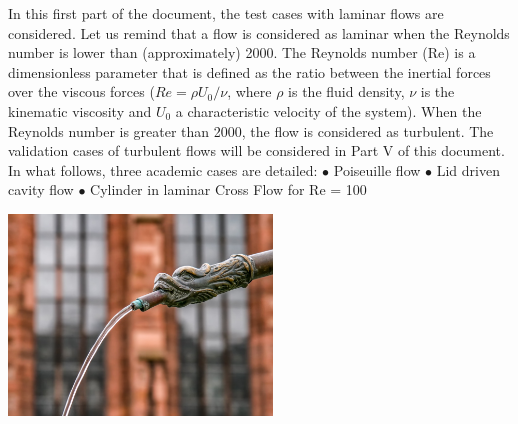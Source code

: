 \vspace*{1.5cm}
In this first part of the document, the test cases with laminar flows are considered. Let us remind that a flow is considered as laminar when the Reynolds number is lower than (approximately) 2000. The Reynolds
number (Re) is a dimensionless parameter that is defined as the ratio between the inertial forces over the viscous forces ($Re=\rho U_{0}/\nu$, where $\rho$ is the fluid density, $\nu$ is the kinematic viscosity and $U_{0}$
a characteristic velocity of the system). When the Reynolds number is greater than 2000, the flow is considered as turbulent. The validation cases of turbulent flows will be considered in Part V of this document. In what
follows, three academic cases are detailed:\vspace*{0.5cm}\newline
\hspace*{0.5cm} $\bullet$ Poiseuille flow\vspace*{0.5cm}\newline
\hspace*{0.5cm} $\bullet$ Lid driven cavity flow\vspace*{0.5cm}\newline
\hspace*{0.5cm} $\bullet$ Cylinder in laminar Cross Flow for Re = 100\vspace*{3cm}\newline
\begin{center}\includegraphics[width=7cm]{tools/jet_laminaire.jpg}\end{center}

